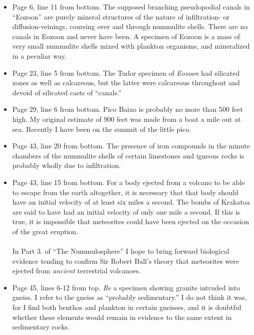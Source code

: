 \documentclass[a4paper, 12pt, oneside]{article}
\begin{document}
\begin{itemize}
    \item Page 6, line 11 from bottom. The supposed branching pseudopodial canals in ``Eozoon'' are purely mineral structures of the nature of infiltration- or diffusion-veinings, coursing over and through nummulite shells. There are no canals in Eozoon and never have been. A specimen of Eozoon is a mass of very small nummulite shells mixed with plankton organisms, and mineralized in a peculiar way.

    \item Page 23, line 5 from bottom. The Tudor specimen of \emph{Eozoon} had silicated zones as well as calcareous, but the latter were calcareous throughout and devoid of silicated casts of ``canals.''

    \item Page 29, line 6 from bottom. Pico Baixo is probably no more than 500 feet high. My original estimate of 900 feet was made from a boat a mile out at sea. Recently I have been on the summit of the little pico.

    \item Page 43, line 20 from bottom. The presence of iron compounds in the minute chambers of the nummulite shells of certain limestones and igneous rocks is probably wholly due to infiltration.

    \item Page 43, line 15 from bottom. For a body ejected from a volcano to be able to escape from the earth altogether, it is necessary that that body should have an initial velocity of at least six miles a second. The bombs of Krakatoa are said to have had an initial velocity of only one mile a second. If this is true, it is impossible that meteorites could have been ejected on the occasion of the great eruption.\\ \\ In Part 3. of ``The Nummulosphere'' I hope to bring forward biological evidence tending to confirm Sir Robert Ball's theory that meteorites were ejected from \emph{ancient} terrestrial volcanoes.

    \item Page 45, lines 6-12 from top. \emph{Re} a specimen showing granite intruded into gneiss. I refer to the gneiss as ``probably sedimentary.'' I do not think it was, for I find both benthos and plankton in certain gneisses, and it is doubtful whether these elements would remain in evidence to the same extent in sedimentary rocks.


\end{itemize}
\end{document}

